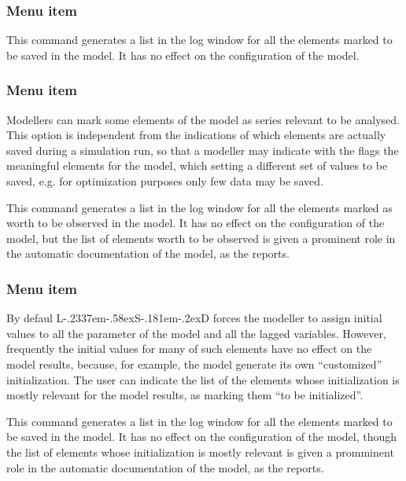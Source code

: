 \documentclass [11pt,a4paper] {book}
\def\LsD{{L\kern-.2337em\lower-.58ex\hbox{S}\kern-.181em\lower-.2ex\hbox{D}}\xspace}
\begin{document}
\subsubsection{Menu item  }

This command generates a list in the log window for all the elements marked to be saved in the model. It has no effect on the configuration of the model.

\subsubsection{Menu item  }

Modellers can mark some elements of the model as series relevant to be analysed. This option is independent from the indications of which elements are actually saved during a simulation run, so that a modeller may indicate with the  flags the meaningful elements for the model, which setting a different set of values to be saved, e.g. for optimization purposes only few data may be saved.

This command generates a list in the log window for all the elements marked as worth to be observed in the model. It has no effect on the configuration of the model, but the list of elements worth to be observed is given a prominent role in the automatic documentation of the model, as the reports.

\subsubsection{Menu item  }

By defaul \LsD forces the modeller to assign initial values to all the parameter of the model and all the lagged variables. However, frequently the initial values for many of such elements have no effect on the model results, because, for example, the model generate its own ``customized'' initialization. The user can indicate the list of the elements whose initialization is mostly relevant for the model results, as marking them ``to be initialized''.

This command generates a list in the log window for all the elements marked to be saved in the model. It has no effect on the configuration of the model, though the list of elements whose initialization is mostly relevant is given a promminent role in the automatic documentation of the model, as the reports.
\end{document}
